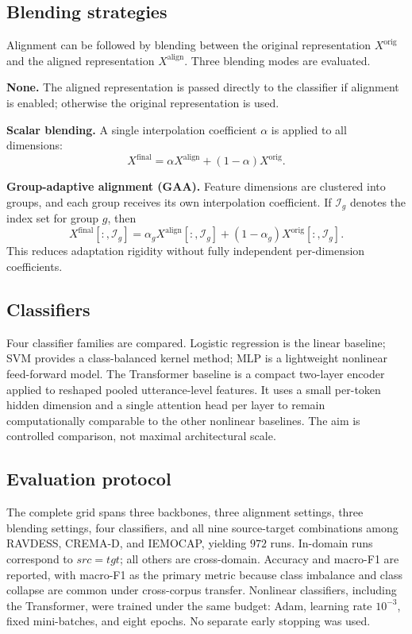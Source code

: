 \documentclass[9pt,twocolumn,letterpaper]{article}
\begin{document}
\subsection{Blending strategies}
Alignment can be followed by blending between the original representation $X^{\mathrm{orig}}$ and the aligned representation $X^{\mathrm{align}}$. Three blending modes are evaluated.

\textbf{None.} The aligned representation is passed directly to the classifier if alignment is enabled; otherwise the original representation is used.

\textbf{Scalar blending.} A single interpolation coefficient $\alpha$ is applied to all dimensions:
\begin{equation}
X^{\mathrm{final}} = \alpha X^{\mathrm{align}} + (1-\alpha)X^{\mathrm{orig}}.
\end{equation}

\textbf{Group-adaptive alignment (GAA).} Feature dimensions are clustered into groups, and each group receives its own interpolation coefficient. If $\mathcal{I}_g$ denotes the index set for group $g$, then
\begin{equation}
X^{\mathrm{final}}[:,\mathcal{I}_g] =
\alpha_g X^{\mathrm{align}}[:,\mathcal{I}_g] +
(1-\alpha_g) X^{\mathrm{orig}}[:,\mathcal{I}_g].
\end{equation}
This reduces adaptation rigidity without fully independent per-dimension coefficients.

\subsection{Classifiers}
Four classifier families are compared. Logistic regression is the linear baseline; SVM provides a class-balanced kernel method; MLP is a lightweight nonlinear feed-forward model. The Transformer baseline is a compact two-layer encoder applied to reshaped pooled utterance-level features. It uses a small per-token hidden dimension and a single attention head per layer to remain computationally comparable to the other nonlinear baselines. The aim is controlled comparison, not maximal architectural scale.

\subsection{Evaluation protocol}
The complete grid spans three backbones, three alignment settings, three blending settings, four classifiers, and all nine source-target combinations among RAVDESS, CREMA-D, and IEMOCAP, yielding $972$ runs. In-domain runs correspond to $src=tgt$; all others are cross-domain. Accuracy and macro-F1 are reported, with macro-F1 as the primary metric because class imbalance and class collapse are common under cross-corpus transfer. Nonlinear classifiers, including the Transformer, were trained under the same budget: Adam, learning rate $10^{-3}$, fixed mini-batches, and eight epochs. No separate early stopping was used.
\end{document}
